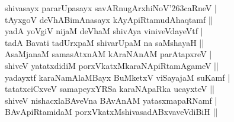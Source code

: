 \begin{entry}
\begin{shl}
shivasayx pararUpasayx savARnugArxhiNoV{\char'263}caRneV |\\
tAyxgoV deVhABimAnasayx kAyApiRtamudAhaqtamf ||\\
yadA yoVgiV nijaM deVhaM shivAya viniveVdayeVtf |\\
tadA Bavati tadUrxpaM shivarUpaM na saMshayaH ||\\
AsaMjanaM samasAtxnAM kAraNAnAM parAtapxreV |\\
shiveV yatatxdidiM porxVkatxMkaraNApiRtamAgameV ||\\
yadayxtf karaNamAlaMBayx BuMketxV viSayajaM suKamf |\\
tatatxciCxveV samapeyxYRSa karaNApaRka ucayxteV ||\\
shiveV nishacxlaBAveVna BAvAnAM yatasxmapaRNamf |\\
BAvApiRtamidaM porxVkatxMshivasadABxvaveVdiBiH ||
\end{shl}


\end{entry}
